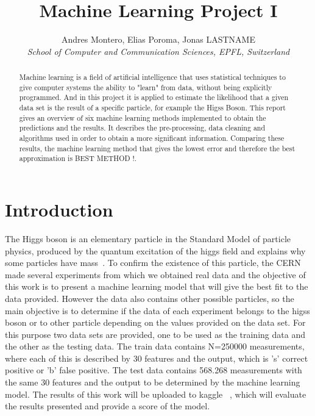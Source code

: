 \documentclass[10pt,conference,compsocconf]{IEEEtran}
\begin{document}
\title{Machine Learning Project I}

\author{
  Andres Montero, Elias Poroma, Jonas LASTNAME\\
  \textit{School of Computer and Communication Sciences, EPFL, Switzerland}
}

\maketitle

\begin{abstract}
  Machine learning is a field of artificial intelligence that uses statistical 
  techniques to give computer systems the ability to "learn" from data, 
  without being explicitly programmed. And in this project it is applied 
  to estimate the likelihood that a given data set is the result of a
  specific particle, for example the Higss Boson.
  This report gives an overview of six machine learning methods implemented
  to obtain the predictions and the results. It describes the pre-processing, 
  data cleaning and algorithms used in order to obtain a more significant 
  information.
  Comparing these results, the machine learning method that gives the 
  lowest error and therefore the best approximation is BEST METHOD !.

\end{abstract}

\section{Introduction}

The Higgs boson is an elementary particle in the Standard Model of 
particle physics, produced by the quantum excitation of the higgs field
and explains why some particles have mass~\cite{wiki01}. To confirm 
the existence of this particle, the CERN made several experiments from 
which we obtained real data and the objective of this work is to present 
a machine learning model that will give the best fit to the data provided.
However the data also contains other possible particles, so the main 
objective is to determine if the data of each experiment belongs to 
the higss boson or to other particle depending on the values provided
on the data set. For this purpose two data sets are provided, one to 
be used as the training data and the other as the testing data. 
The train data contains N=250000 measurements, where each of this
is described by 30 features and the output, which is 's' correct positive
or 'b' false positive. The test data contains 568.268 measurements with
the same 30 features and the output to be determined by the machine
learning model. The results of this work will be uploaded to kaggle ~\cite{kaggle01}, 
which will evaluate the results presented and provide a score of the 
model.
\end{document}
